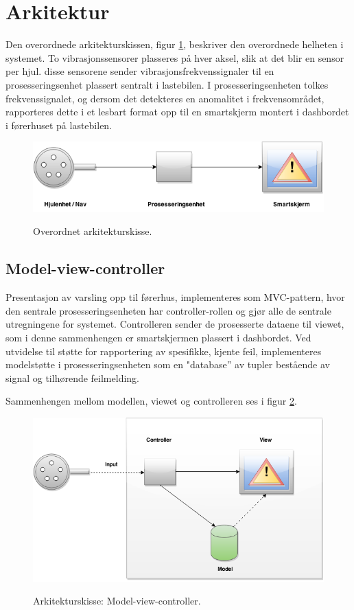 \section{Arkitektur}
Den overordnede arkitekturskissen, figur \ref{fig:overordnet-ark}, 
beskriver den overordnede helheten i systemet. To vibrasjonssensorer plasseres
på hver aksel, slik at det blir en sensor per hjul. disse sensorene sender 
vibrasjonsfrekvenssignaler til en prosesseringsenhet plassert sentralt i lastebilen. 
I prosesseringsenheten tolkes frekvenssignalet, og dersom det detekteres en 
anomalitet i frekvensområdet, rapporteres dette i et lesbart format opp til en 
smartskjerm montert i dashbordet i førerhuset på lastebilen.
\newline
\begin{figure}[H]
	\centering
	\includegraphics[width=1.00\textwidth]{images/arkitektur-overordnet.png}
	\label{fig:overordnet-ark}
	\caption{Overordnet arkitekturskisse.}
\end{figure}

\subsection{Model-view-controller}
\label{sec:arkitektur}
Presentasjon av varsling opp til førerhus, implementeres som MVC-pattern, 
hvor den sentrale prosesseringsenheten har controller-rollen og gjør alle 
de sentrale utregningene for systemet. Controlleren sender de prosesserte 
dataene til viewet, som i denne sammenhengen er smartskjermen plassert i 
dashbordet. Ved utvidelse til støtte for rapportering av spesifikke, 
kjente feil, implementeres modelstøtte i prosesseringsenheten som en 
"database'' av tupler bestående av signal og tilhørende feilmelding. 

Sammenhengen mellom modellen, viewet og controlleren ses i figur \ref{fig:mvc}.
\newline
\begin{figure}[H]
	\centering
	\includegraphics[width=1.00\textwidth]{images/architecture2-mvc.png}
	\label{fig:mvc}
	\caption{Arkitekturskisse: Model-view-controller.}
\end{figure}